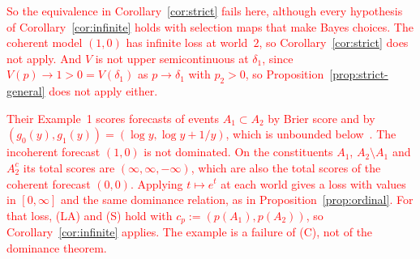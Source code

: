 \documentclass[11pt]{article}
\theoremstyle{definition}
\theoremstyle{remark}
\begin{document}
\textcolor{red}{So the equivalence in Corollary~\ref{cor:strict} fails here, although every hypothesis of Corollary~\ref{cor:infinite} holds with selection maps that make Bayes choices. The coherent model $(1,0)$ has infinite loss at world~$2$, so Corollary~\ref{cor:strict} does not apply. And $V$ is not upper semicontinuous at $\delta_1$, since $V(p)\to1>0=V(\delta_1)$ as $p\to\delta_1$ with $p_2>0$, so Proposition~\ref{prop:strict-general} does not apply either.}

\textcolor{red}{Their Example~1 scores forecasts of events $A_1\subset A_2$ by Brier score and by $(g_0(y),g_1(y))=(\log y,\log y+1/y)$, which is unbounded below~\cite[Example~1]{SSK09}. The incoherent forecast $(1,0)$ is not dominated. On the constituents $A_1$, $A_2\setminus A_1$ and $A_2^c$ its total scores are $(\infty,\infty,-\infty)$, which are also the total scores of the coherent forecast $(0,0)$. Applying $t\mapsto e^t$ at each world gives a loss with values in $[0,\infty]$ and the same dominance relation, as in Proposition~\ref{prop:ordinal}. For that loss, (LA) and (S) hold with $c_p:=(p(A_1),p(A_2))$, so Corollary~\ref{cor:infinite} applies. The example is a failure of (C), not of the dominance theorem.}
\end{document}
